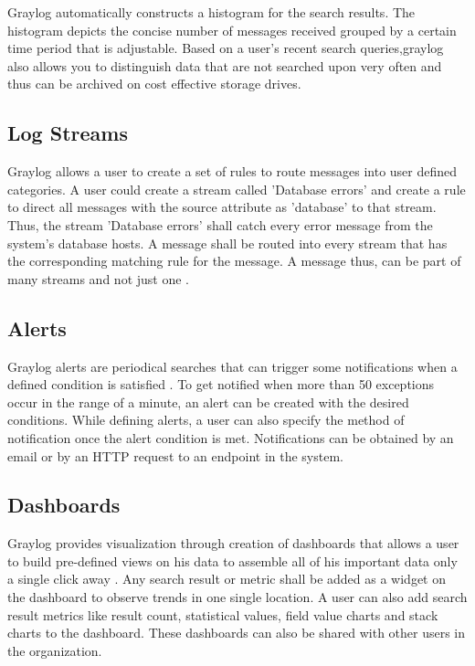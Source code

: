 \documentclass[9pt,twocolumn,twoside]{styles/osajnl}
\begin{document}
Graylog automatically constructs a histogram for the search
results. The histogram depicts the concise number of messages received
grouped by a certain time period that is adjustable.  Based on a
user’s recent search queries,graylog also allows you to distinguish
data that are not searched upon very often and thus can be archived on
cost effective storage drives.

\subsection{Log Streams}

Graylog allows a user to create a set of rules to route messages into
user defined categories. A user could create a stream called 'Database
errors' and create a rule to direct all messages with the source
attribute as 'database' to that stream. Thus, the stream 'Database
errors' shall catch every error message from the system's database
hosts. A message shall be routed into every stream that has the
corresponding matching rule for the message. A message thus, can be
part of many streams and not just one \cite{www-graylog-streams}.

\subsection{Alerts}

Graylog alerts are periodical searches that can trigger some
notifications when a defined condition is satisfied
\cite{www-graylog-alerts}. To get notified when more than 50
exceptions occur in the range of a minute, an alert can be created
with the desired conditions.  While defining alerts, a user can also
specify the method of notification once the alert condition is
met. Notifications can be obtained by an email or by an HTTP request
to an endpoint in the system.

\subsection{Dashboards}

Graylog provides visualization through creation of dashboards that
allows a user to build pre-defined views on his data to assemble all
of his important data only a single click away
\cite{www-graylog-dashboards}. Any search result or metric shall be
added as a widget on the dashboard to observe trends in one single
location.  A user can also add search result metrics like result
count, statistical values, field value charts and stack charts to the
dashboard. These dashboards can also be shared with other users in the
organization.
\end{document}
